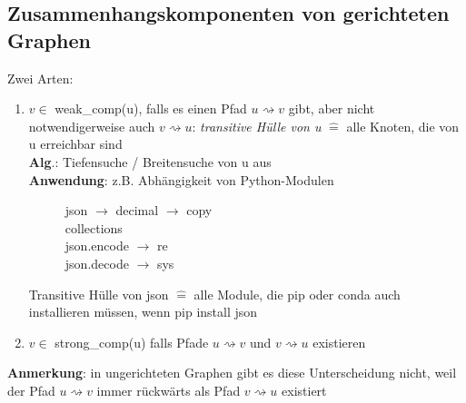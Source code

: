     \subsection*{Zusammenhangskomponenten von gerichteten Graphen}

    Zwei Arten:
    \begin{enumerate}
        \item $v \in$ weak\_comp(u), falls es einen Pfad $u \rightsquigarrow v$ gibt, aber nicht notwendigerweise auch $v \rightsquigarrow u$: \emph{transitive Hülle von u} $\widehat{=}$ alle Knoten, die von u erreichbar sind\\
        \textbf{Alg}.: Tiefensuche / Breitensuche von u aus \\
        \textbf{Anwendung}: z.B. Abhängigkeit von Python-Modulen

        \begin{figure}[htbp]
            \hspace*{2cm}json $\rightarrow$ decimal $\rightarrow$ copy \\
            \hspace*{5cm}  collections\\
            \hspace*{3cm}  json.encode \raisebox{-1.5mm}{$\searrow$} \hspace*{-5mm}$\rightarrow$ re\\
            \hspace*{3cm}  json.decode \raisebox{2mm}{$\nearrow$} \hspace*{-6mm} $\rightarrow$ sys
        \end{figure}
        Transitive Hülle von json $\widehat{=}$ alle Module, die pip oder conda auch installieren müssen, wenn \glqq pip install json\grqq
        \item $v \in$ strong\_comp(u) falls Pfade $u \rightsquigarrow v$ und $v \rightsquigarrow u$ existieren
    \end{enumerate}
    \textbf{Anmerkung}: in ungerichteten Graphen gibt es diese Unterscheidung nicht, weil der Pfad $u \rightsquigarrow v$ immer rückwärts als Pfad $v \rightsquigarrow u$ existiert\\

